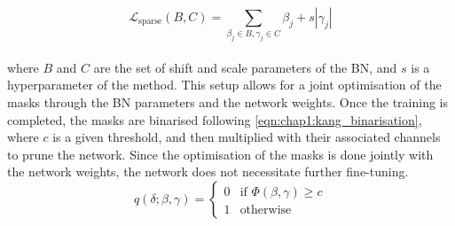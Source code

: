 \begin{equation}
 \mathcal{L}_{\text{{sparse}}}(B, C) = \sum_{\beta_j \in B, \gamma_j \in C} \beta_j + s|\gamma_j|
\end{equation}\\

\noindent where $B$ and $C$ are the set of shift and scale parameters of the
\ac{BN}, and $s$ is a hyperparameter of the method. This setup allows for a
joint optimisation of the masks through the \ac{BN} parameters and the network
weights. Once the training is completed, the masks are binarised following
\cref{eqn:chap1:kang_binarisation}, where $c$ is a given threshold, and then
multiplied with their associated channels to prune the network. Since the
optimisation of the masks is done jointly with the network weights, the network
does not necessitate further fine-tuning.\\


\begin{equation}
  \label{eqn:chap1:kang_binarisation}
  q(\delta;\beta,\gamma) = \begin{cases}
    0 & \text{if } \Phi(\beta,\gamma) \geq c \\
    1 & \text{otherwise}
  \end{cases}
\end{equation}\\



